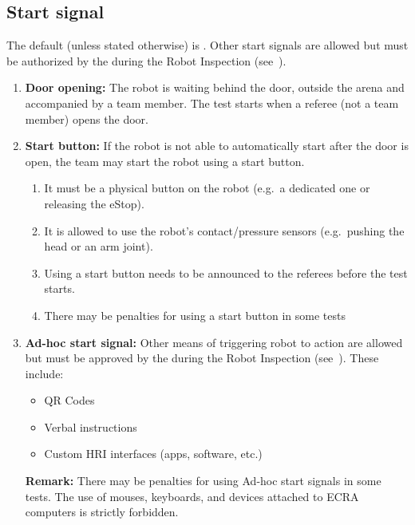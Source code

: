 \subsection{Start signal}
\label{rule:start_signal}
The default  (unless stated otherwise) is .
Other start signals are allowed but must be authorized by the  during the Robot Inspection (see~).

\begin{enumerate}
	\item \textbf{Door opening:} The robot is waiting behind the door, outside the arena and accompanied by a team member.
	The test starts when a referee (not a team member) opens the door.

	\item \textbf{Start button:} If the robot is not able to automatically start after the door is open, the team may start the robot using a start button.
	\begin{enumerate}[nosep]
		\item It must be a physical button on the robot (e.g.~a dedicated one or releasing the eStop).
		\item It is allowed to use the robot's contact/pressure sensors (e.g.~pushing the head or an arm joint).
		\item Using a start button needs to be announced to the referees before the test starts.
		\item There may be penalties for using a start button in some tests
	\end{enumerate}

	\item \textbf{Ad-hoc start signal:} Other means of triggering robot to action are allowed but must be approved by the  during the Robot Inspection (see~).
	These include:
	\begin{itemize}[nosep]
		\item QR Codes
		\item Verbal instructions
		\item Custom HRI interfaces (apps, software, etc.)
	\end{itemize}
	\textbf{Remark:} There may be penalties for using Ad-hoc start signals in some tests. The use of mouses, keyboards, and devices attached to ECRA computers is strictly forbidden.

\end{enumerate}



